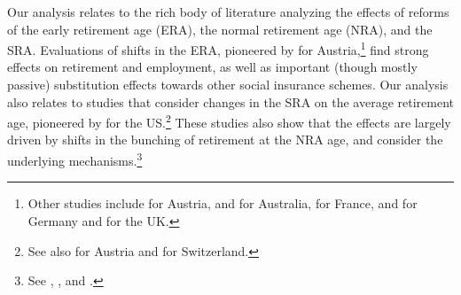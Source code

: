\documentclass[12pt,a4paper]{article}
\begin{document}
Our analysis relates to the rich body of literature analyzing the effects of reforms of the early retirement age (ERA), the normal retirement age (NRA), and the SRA. 
Evaluations of shifts in the ERA, pioneered by \cite{staubli_does_2013} for Austria,\footnote{Other studies include \cite{manoli_effects_2018} for Austria, \cite{atalay_impact_2015} and \cite{oguzoglu_et_al_2020} for Australia, \cite{rabate_employment_2019} for France, \cite{geyer_closing_2021} and \cite{seibold2019reference} for Germany and \cite{cribb2016signals} for the UK.} find strong effects on retirement and employment, as well as important (though mostly passive) substitution effects towards other social insurance schemes. Our analysis also relates to studies that consider changes in the SRA on the average retirement age, pioneered by \cite{mastrobuoni_labor_2009} for the US.\footnote{See also \cite{manoli_effects_2018} for Austria and \cite{lalive2019raising} for Switzerland.} These studies also show that the effects are largely driven by shifts in the bunching of retirement at the NRA age, and consider the underlying mechanisms.\footnote{See  \cite{behaghel_framing_2012}, \cite{Brown2013}, \cite{lalive2019raising} and \cite{seibold2019reference}.} 


\end{document}
